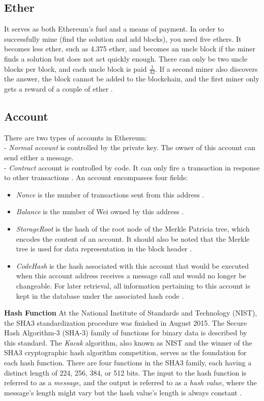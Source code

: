 \subsection{Ether}
It serves as both Ethereum's fuel and a means of payment. In order to successfully mine (find the solution and add blocks), you need five ethers. It becomes less ether, such as 4.375 ether, and becomes an uncle block if the miner finds a solution but does not act quickly enough. There can only be two uncle blocks per block, and each uncle block is paid $\frac{1}{32}$. If a second miner also discovers the answer, the block cannot be added to the blockchain, and the first miner only gets a reward of a couple of ether \cite{Egbertsen}.
\subsection{Account}
There are two types of accounts in Ethereum:\\
- \textit{Normal account} is controlled by the private key. The owner of this account can send either a message.\\
- \textit{Contract} account is controlled by code. It can only fire a transaction in response to other transactions \cite{Egbertsen}. An account encompasses four fields:\\
 \begin{itemize}
    \item \textit{Nonce} is the number of transactions sent from this address \cite{Gavin}.
    \item \textit{Balance} is the number of Wei owned by this address \cite{Gavin}.
    \item \textit{StorageRoot} is the hash of the root node of the Merkle Patricia tree, which encodes the content of an account. It should also be noted that the Merkle tree is used for data representation in the block header \cite{Gavin}.
    \item \textit{CodeHash} is the hash associated with this account that would be executed when this account address receives a message call and would no longer be changeable. For later retrieval, all information pertaining to this account is kept in the database under the associated hash code \cite{Gavin}.
\end{itemize}
\textbf{Hash Function}
At the National Institute of Standards and Technology (NIST), the SHA3 standardization procedure was finished in August 2015. The Secure Hash Algorithm-3 (SHA-3) family of functions for binary data is described by this standard. The \textit{Kacak} algorithm, also known as NIST and the winner of the SHA3 cryptographic hash algorithm competition, serves as the foundation for each hash function. There are four functions in the SHA3 family, each having a distinct length of 224, 256, 384, or 512 bits.
The input to the hash function is referred to as a \textit{message}, and the output is referred to as a \textit{hash value}, where the message's length might vary but the hash value's length is always constant \cite{Dworkin}.


